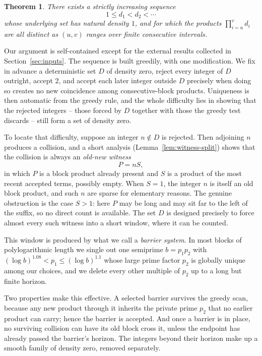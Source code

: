 \documentclass[11pt]{article}
\newtheorem{theorem}{Theorem}[section]
\theoremstyle{definition}
\newcommand{\1}{\mathbf 1}
\begin{document}
\begin{theorem}\label{thm:main}
There exists a strictly increasing sequence
\[
  1\le d_1<d_2<\cdots
\]
whose underlying set has natural density \(1\), and for which the products
\(\prod_{i=u}^v d_i\) are all distinct as \((u,v)\) ranges over finite
consecutive intervals.
\end{theorem}

Our argument is self-contained except for the external results collected in
Section~\ref{sec:inputs}.  The sequence is built greedily, with one
modification.  We fix in advance a deterministic set \(D\) of density zero,
reject every integer of \(D\) outright, accept \(2\), and accept each later
integer outside \(D\) precisely when doing so creates no new coincidence among
consecutive-block products.  Uniqueness is then automatic from the greedy
rule, and the whole difficulty lies in showing that the rejected integers --
those forced by \(D\) together with those the greedy test discards -- still
form a set of density zero.

To locate that difficulty, suppose an integer \(n\notin D\) is rejected.  Then
adjoining \(n\) produces a collision, and a short analysis
(Lemma~\ref{lem:witness-split}) shows that the collision is always an
\emph{old-new witness}
\[
  P=nS,
\]
in which \(P\) is a block product already present and \(S\) is a product of
the most recent accepted terms, possibly empty.  When \(S=1\), the integer
\(n\) is itself an old block product, and such \(n\) are sparse for elementary
reasons.  The genuine obstruction is the case \(S>1\): here \(P\) may be long
and may sit far to the left of the suffix, so no direct count is available.
The set \(D\) is designed precisely to force almost every such witness into a
short window, where it can be counted.

This window is produced by what we call a \emph{barrier system}.  In most blocks
of polylogarithmic length we single out one semiprime \(b=p_1p_2\) with
\((\log b)^{1.08}<p_1\le(\log b)^{1.1}\) whose large prime factor \(p_2\) is
globally unique among our choices, and we delete every other multiple of
\(p_2\) up to a long but finite horizon.

Two properties make this effective.  A selected barrier survives the greedy
scan, because any new product through it inherits the private prime \(p_2\)
that no earlier product can carry; hence the barrier is accepted.  And once a
barrier is in place, no surviving collision can have its old block cross it,
unless the endpoint has already passed the barrier's horizon.  The integers
beyond their horizon make up a smooth family of density zero, removed
separately.
\end{document}
